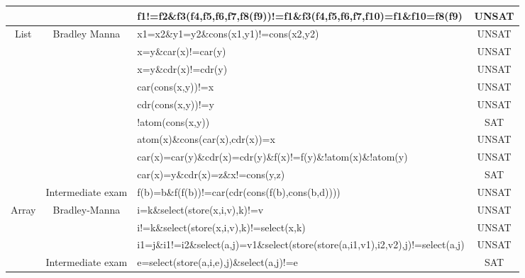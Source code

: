 \documentclass{IEEEtran}
\begin{document}
\begin{table}[htpb]
{\begin{tabular}{@{}cclc@{}}
			&                   & f1!=f2\&f3(f4,f5,f6,f7,f8(f9))!=f1\&f3(f4,f5,f6,f7,f10)=f1\&f10=f8(f9)                                     & UNSAT           \\\hline
			List            & Bradley Manna\cite{10.5555/1324777}     & x1=x2\&y1=y2\&cons(x1,y1)!=cons(x2,y2)                                                                     & UNSAT           \\
			&                   & x=y\&car(x)!=car(y)                                                                                        & UNSAT           \\
			&                   & x=y\&cdr(x)!=cdr(y)                                                                                        & UNSAT           \\
			&                   & car(cons(x,y))!=x                                                                                          & UNSAT           \\
			&                   & cdr(cons(x,y))!=y                                                                                          & UNSAT           \\
			&                   & !atom(cons(x,y))                                                                                           & SAT             \\
			&                   & atom(x)\&cons(car(x),cdr(x))=x                                                                             & UNSAT           \\
			&                   & car(x)=car(y)\&cdr(x)=cdr(y)\&f(x)!=f(y)\&!atom(x)\&!atom(y)                                               & UNSAT           \\
			&                   & car(x)=y\&cdr(x)=z\&x!=cons(y,z)                                                                           & SAT             \\
			& Intermediate exam & f(b)=b\&f(f(b))!=car(cdr(cons(f(b),cons(b,d))))                                                            & UNSAT           \\\hline
			Array           & Bradley-Manna\cite{10.5555/1324777}     & i=k\&select(store(x,i,v),k)!=v                                                                             & UNSAT           \\
			&                   & i!=k\&select(store(x,i,v),k)!=select(x,k)                                                                  & UNSAT           \\
			&                   & i1=j\&i1!=i2\&select(a,j)=v1\&select(store(store(a,i1,v1),i2,v2),j)!=select(a,j)                           & UNSAT           \\
			& Intermediate exam & e=select(store(a,i,e),j)\&select(a,j)!=e                                                                   & SAT             \\ \bottomrule
		\end{tabular}%
	}
\end{table}
\end{document}
